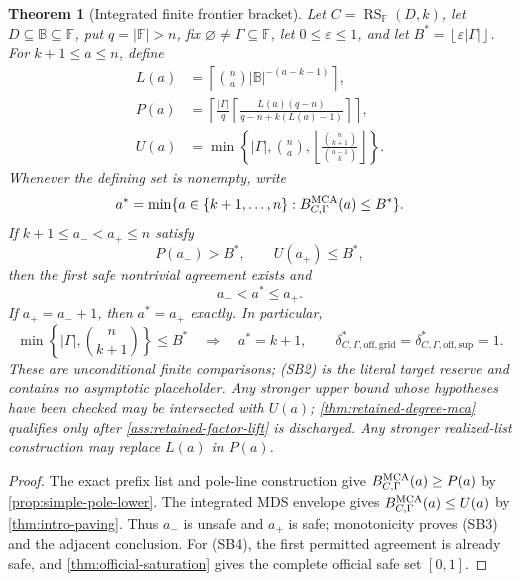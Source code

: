 \documentclass[11pt,a4paper]{amsart}
\numberwithin{equation}{section}
\newtheorem{theorem}{Theorem}[section]
\theoremstyle{remark}
\DeclareMathOperator{\RS}{RS}
\newcommand{\F}{\mathbb F}
\newcommand{\B}{\mathbb B}
\newcommand{\eps}{\varepsilon}
\newcommand{\abs}[1]{\lvert #1\rvert}
\newcommand{\floor}[1]{\left\lfloor #1\right\rfloor}
\newcommand{\ceil}[1]{\left\lceil #1\right\rceil}
\begin{document}
\begin{theorem}[Integrated finite frontier bracket]
\label{thm:unconditional-support-envelope-bracket}
Let \(C=\RS_\F(D,k)\), let \(D\subseteq\B\subseteq\F\), put
\(q=\abs\F>n\), fix \(\varnothing\ne\Gamma\subseteq\F\), let
\(0\le\eps\le1\), and let
\(B^*=\floor{\eps\abs\Gamma}\).  For \(k+1\le a\le n\), define
\[
 \begin{split}
 L(a)&=\ceil{\binom na\abs\B^{-(a-k-1)}},\\
 P(a)&=\left\lceil\frac{\abs\Gamma}{q}
       \left\lceil\frac{L(a)(q-n)}
       {q-n+k(L(a)-1)}\right\rceil\right\rceil,\\
 U(a)&=\min\left\{\abs\Gamma,\binom na,
       \floor{\frac{\binom n{k+1}}{\binom{a-1}k}}\right\}.
 \end{split}                                       \tag{SB1}
\]
Whenever the defining set is nonempty, write
\[
 a^*=\min\{a\in\{k+1,\ldots,n\}:
               B_{C,\Gamma}^{\rm MCA}(a)\le B^*\}.
\]
If \(k+1\le a_-<a_+\le n\) satisfy
\[
                         P(a_-)>B^*,\qquad U(a_+)\le B^*, \tag{SB2}
\]
then the first safe nontrivial agreement exists and
\[
                         a_-<a^*\le a_+.            \tag{SB3}
\]
If \(a_+=a_-+1\), then \(a^*=a_+\) exactly.  In particular,
\[
 \min\left\{\abs\Gamma,\binom n{k+1}\right\}\le B^*
 \quad\Longrightarrow\quad
 a^*=k+1,\qquad
 \delta_{C,\Gamma,\mathrm{off,grid}}^*
 =\delta_{C,\Gamma,\mathrm{off,sup}}^*=1.         \tag{SB4}
\]
These are unconditional finite comparisons; \textup{(SB2)} is the
literal target reserve and contains no asymptotic placeholder.  Any
stronger upper bound whose hypotheses have been checked may be intersected
with \(U(a)\); \cref{thm:retained-degree-mca} qualifies only after
\cref{ass:retained-factor-lift} is discharged.  Any
stronger realized-list construction may replace \(L(a)\) in \(P(a)\).
\end{theorem}

\begin{proof}
The exact prefix list and pole-line construction give
\(B_{C,\Gamma}^{\rm MCA}(a)\ge P(a)\) by
\cref{prop:simple-pole-lower}.  The integrated MDS envelope gives
\(B_{C,\Gamma}^{\rm MCA}(a)\le U(a)\) by
\cref{thm:intro-paving}.  Thus \(a_-\) is unsafe and \(a_+\) is
safe; monotonicity proves \textup{(SB3)} and the adjacent conclusion.
For \textup{(SB4)}, the first permitted agreement is already safe, and
\cref{thm:official-saturation} gives the complete official safe set
\([0,1]\).
\end{proof}
\end{document}
